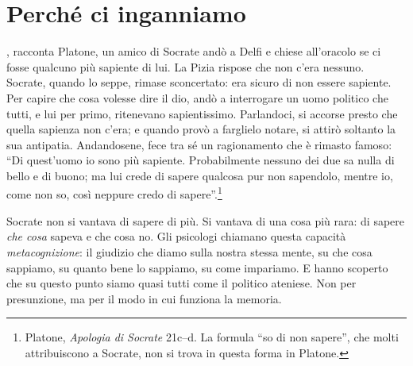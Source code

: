 %
\chapter{Perché ci inganniamo}
\label{cap:inganni}


, racconta Platone, un amico di Socrate andò a
Delfi e chiese all'oracolo se ci fosse qualcuno più sapiente di lui.
La Pizia rispose che non c'era nessuno. Socrate, quando lo seppe, rimase
sconcertato: era sicuro di non essere sapiente. Per capire che cosa
volesse dire il dio, andò a interrogare un uomo politico che tutti, e
lui per primo, ritenevano sapientissimo. Parlandoci, si accorse presto
che quella sapienza non c'era; e quando provò a farglielo notare, si
attirò soltanto la sua antipatia. Andandosene, fece tra sé un
ragionamento che è rimasto famoso: \enquote{Di quest'uomo io sono più
sapiente. Probabilmente nessuno dei due sa nulla di bello e di buono;
ma lui crede di sapere qualcosa pur non sapendolo, mentre io, come non
so, così neppure credo di sapere}.\footnote{Platone, \emph{Apologia di
Socrate} 21c--d. La formula \enquote{so di non sapere}, che molti
attribuiscono a Socrate, non si trova in questa forma in Platone.}

Socrate non si vantava di sapere di più. Si vantava di una cosa più
rara: di sapere \emph{che cosa} sapeva e che cosa no. Gli psicologi
chiamano questa capacità \emph{metacognizione}: il giudizio che
diamo sulla nostra stessa mente, su che cosa sappiamo, su quanto bene
lo sappiamo, su come impariamo. E hanno scoperto che su questo punto
siamo quasi tutti come il politico ateniese. Non per presunzione, ma
per il modo in cui funziona la memoria.

